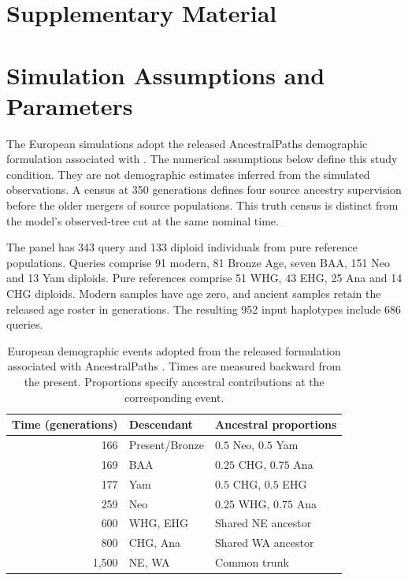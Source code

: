 \documentclass[letterpaper]{article}
\begin{document}
\section*{Supplementary Material}

\section{Simulation Assumptions and Parameters}
\label{app:simulation}
The European simulations adopt the released AncestralPaths demographic formulation associated with \citet{eurasians2024}. The numerical assumptions below define this study condition. They are not demographic estimates inferred from the simulated observations. A census at 350 generations defines four source ancestry supervision before the older mergers of source populations. This truth census is distinct from the model's observed-tree cut at the same nominal time.

The panel has 343 query and 133 diploid individuals from pure reference populations. Queries comprise 91 modern, 81 Bronze Age, seven BAA, 151 Neo and 13 Yam diploids. Pure references comprise 51 WHG, 43 EHG, 25 Ana and 14 CHG diploids. Modern samples have age zero, and ancient samples retain the released age roster in generations. The resulting 952 input haplotypes include 686 queries.

\begin{table}[t]
\centering
\small
\begin{tabular}{@{}rll@{}}
\toprule
Time (generations) & Descendant & Ancestral proportions\\
\midrule
166 & Present/Bronze & $0.5$ Neo, $0.5$ Yam\\
169 & BAA & $0.25$ CHG, $0.75$ Ana\\
177 & Yam & $0.5$ CHG, $0.5$ EHG\\
259 & Neo & $0.25$ WHG, $0.75$ Ana\\
600 & WHG, EHG & Shared NE ancestor\\
800 & CHG, Ana & Shared WA ancestor\\
1,500 & NE, WA & Common trunk\\
\bottomrule
\end{tabular}
\caption{European demographic events adopted from the released formulation associated with AncestralPaths \citep{eurasians2024}. Times are measured backward from the present. Proportions specify ancestral contributions at the corresponding event.}
\label{tab:demography}
\end{table}
\end{document}
